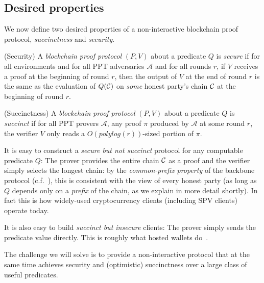 \subsection{Desired properties}

We now define two desired properties of a non-interactive blockchain proof
protocol, \emph{succinctness} and \emph{security}.

\begin{definition}{(Security)}
A \emph{blockchain proof protocol} $(P, V)$ about a predicate $Q$ is
\emph{secure} if for all environments and for all PPT adversaries
$\mathcal{A}$ and for all rounds $r$, if $V$ receives a proof at the beginning
of round $r$, then the output of $V$ at the end of round $r$ is the same as the
evaluation of $Q(\mathcal{C})$ on \emph{some} honest party's chain $\mathcal{C}$ at the
beginning of round $r$.
\end{definition}

\begin{definition}{(Succinctness)}
A \emph{blockchain proof protocol} $(P, V)$ about a predicate $Q$ is
\emph{succinct} if for all PPT provers $\mathcal{A}$, any proof $\pi$ produced
by $\mathcal{A}$ at some round $r$, the verifier $V$ only reads a
$O(polylog(r))$-sized portion of $\pi$.
\end{definition}

It is easy to construct a \emph{secure but not succinct} protocol for any
computable predicate $Q$: The prover provides the entire chain $\mathcal{C}$ as a
proof and the verifier simply selects the longest chain: by the
\emph{common-prefix property} of the backbone protocol (c.f.~\cite{backbone}),
this is consistent with the view of every honest party (as long as $Q$ depends
only on a \emph{prefix} of the chain, as we explain in more detail shortly). In
fact this is how widely-used cryptocurrency clients (including SPV clients)
operate today.

It is also easy to build \emph{succinct but insecure} clients: The prover simply
sends the predicate value directly. This is roughly what hosted wallets
do~\cite{sok}.

The challenge we will solve is to provide a non-interactive protocol that at the
same time achieves security and (optimistic) succinctness over a large class of
useful predicates.
